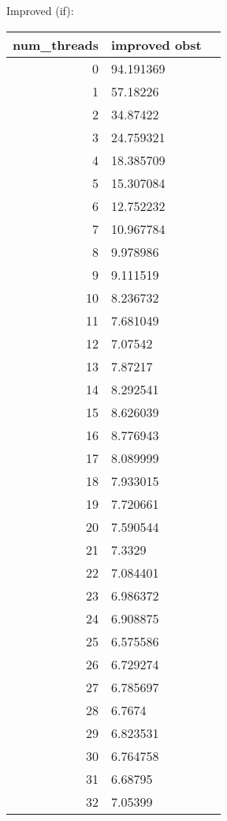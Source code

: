 \documentclass[a4paper,12pt]{scrartcl}
\begin{document}
Improved (if):\\
\begin{tabular}{|r|l|l|}
num\_threads & improved obst\\  \hline 
0  & 94.191369  \\ \hline 
1  & 57.18226   \\ \hline 
2  & 34.87422   \\ \hline
3  & 24.759321  \\ \hline
4  & 18.385709  \\ \hline
5  & 15.307084  \\ \hline
6  & 12.752232  \\ \hline
7  & 10.967784  \\ \hline
8  & 9.978986   \\ \hline
9  & 9.111519   \\ \hline
10 & 8.236732   \\ \hline
11 & 7.681049   \\ \hline
12 & 7.07542    \\ \hline
13 & 7.87217    \\ \hline
14 & 8.292541   \\ \hline
15 & 8.626039   \\ \hline
16 & 8.776943   \\ \hline
17 & 8.089999   \\ \hline
18 & 7.933015   \\ \hline
19 & 7.720661   \\ \hline
20 & 7.590544   \\ \hline
21 & 7.3329     \\ \hline
22 & 7.084401   \\ \hline
23 & 6.986372   \\ \hline
24 & 6.908875   \\ \hline
25 & 6.575586   \\ \hline
26 & 6.729274   \\ \hline
27 & 6.785697   \\ \hline
28 & 6.7674     \\ \hline
29 & 6.823531   \\ \hline
30 & 6.764758   \\ \hline
31 & 6.68795    \\ \hline
32 & 7.05399    \\ \hline
\end{tabular} 
\end{document}
